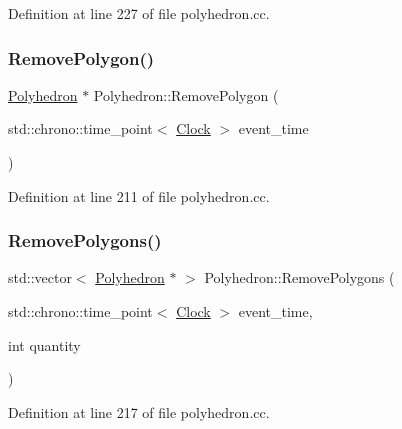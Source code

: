 Definition at line 227 of file polyhedron.\+cc.

\mbox{\label{class_polyhedron_a3b411fa617291a2a2d5df92b819285b4}} 
\subsubsection{\texorpdfstring{Remove\+Polygon()}{RemovePolygon()}}
{\footnotesize\ttfamily \mbox{\hyperlink{class_polyhedron}{Polyhedron}} $\ast$ Polyhedron\+::\+Remove\+Polygon (\begin{DoxyParamCaption}\item[{std\+::chrono\+::time\+\_\+point$<$ \mbox{\hyperlink{universe_8h_a0ef8d951d1ca5ab3cfaf7ab4c7a6fd80}{Clock}} $>$}]{event\+\_\+time }\end{DoxyParamCaption})}



Definition at line 211 of file polyhedron.\+cc.

\mbox{\label{class_polyhedron_a5c2639b21aec25b76449fdf4c209aad1}} 
\subsubsection{\texorpdfstring{Remove\+Polygons()}{RemovePolygons()}}
{\footnotesize\ttfamily std\+::vector$<$ \mbox{\hyperlink{class_polyhedron}{Polyhedron}} $\ast$ $>$ Polyhedron\+::\+Remove\+Polygons (\begin{DoxyParamCaption}\item[{std\+::chrono\+::time\+\_\+point$<$ \mbox{\hyperlink{universe_8h_a0ef8d951d1ca5ab3cfaf7ab4c7a6fd80}{Clock}} $>$}]{event\+\_\+time,  }\item[{int}]{quantity }\end{DoxyParamCaption})}



Definition at line 217 of file polyhedron.\+cc.

\mbox{\label{class_polyhedron_ae90c347cfb8ca8028a260e88bef2b45c}} 
